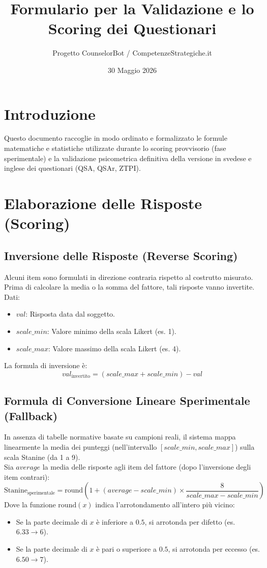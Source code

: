 \documentclass[11pt,a4paper]{article}
\title{\textbf{Formulario per la Validazione e lo Scoring dei Questionari}}
\author{Progetto CounselorBot / CompetenzeStrategiche.it}
\date{30 Maggio 2026}
\begin{document}
\maketitle

\section{Introduzione}
Questo documento raccoglie in modo ordinato e formalizzato le formule matematiche e statistiche utilizzate durante lo scoring provvisorio (fase sperimentale) e la validazione psicometrica definitiva della versione in svedese e inglese dei questionari (QSA, QSAr, ZTPI).

\section{Elaborazione delle Risposte (Scoring)}

\subsection{Inversione delle Risposte (Reverse Scoring)}
Alcuni item sono formulati in direzione contraria rispetto al costrutto misurato. Prima di calcolare la media o la somma del fattore, tali risposte vanno invertite.
\\
Dati:
\begin{itemize}
    \item $val$: Risposta data dal soggetto.
    \item $scale\_min$: Valore minimo della scala Likert (es. 1).
    \item $scale\_max$: Valore massimo della scala Likert (es. 4).
\end{itemize}
La formula di inversione è:
\begin{equation}
val_{\text{invertito}} = (scale\_max + scale\_min) - val
\end{equation}

\subsection{Formula di Conversione Lineare Sperimentale (Fallback)}
In assenza di tabelle normative basate su campioni reali, il sistema mappa linearmente la media dei punteggi (nell'intervallo $[scale\_min, scale\_max]$) sulla scala Stanine (da 1 a 9).
\\
Sia $average$ la media delle risposte agli item del fattore (dopo l'inversione degli item contrari):
\begin{equation}
\text{Stanine}_{\text{sperimentale}} = \text{round}\left( 1 + (average - scale\_min) \times \frac{8}{scale\_max - scale\_min} \right)
\end{equation}
Dove la funzione $\text{round}(x)$ indica l'arrotondamento all'intero più vicino:
\begin{itemize}
    \item Se la parte decimale di $x$ è inferiore a $0.5$, si arrotonda per difetto (es. $6.33 \rightarrow 6$).
    \item Se la parte decimale di $x$ è pari o superiore a $0.5$, si arrotonda per eccesso (es. $6.50 \rightarrow 7$).
\end{itemize}
\end{document}
